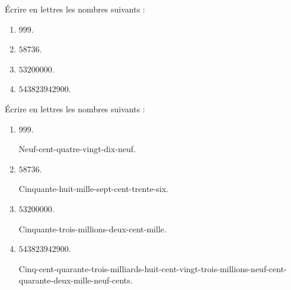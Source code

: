 \begin{exercice}
    Écrire en lettres les nombres suivants :
    \begin{enumerate}
       \item $\num{999}$.
       \item $\num{58736}$.
       \item $\num{53200000}$.
       \item $\num{543823942900}$.
    \end{enumerate}
 \end{exercice}

 \begin{corrige}
    Écrire en lettres les nombres suivants :
    
    \begin{enumerate}
       \item $\num{999}$.
       
       {\red Neuf-cent-quatre-vingt-dix-neuf.}
       \item $\num{58736}$.
       
       {\red Cinquante-huit-mille-sept-cent-trente-six.}
       \item $\num{53200000}$.
       
       {\red Cinquante-trois-millions-deux-cent-mille.}
       \item $\num{543823942900}$.
       
       {\red Cinq-cent-quarante-trois-milliards-huit-cent-vingt-trois-millions-neuf-cent-quarante-deux-mille-neuf-cents.}
    \end{enumerate}
 \end{corrige}